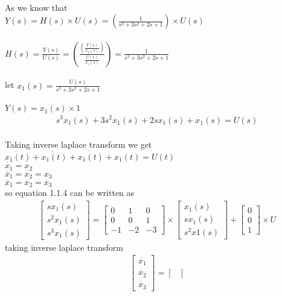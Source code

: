 \begin{enumerate}[label=\thesection.\arabic*.,ref=\thesection.\theenumi]
\\ As we know that
\\ $Y(s)=H(s) \times U(s)= (\frac{1}{s^3+3s^2+2s+1}) \times U(s) $
\\
\\ $H(s)=\frac{Y(s)}{U(s)}=(\frac{(\frac{Y(s)}{x_{1}(s)})}{\frac{U(s)}{x_{1}(s)}})=\frac{1}{s^3+3s^2+2s+1} $
\\
\\let   $x_{1}(s)=\frac{U(s)}{s^3+3s^2+2s+1}$
\\
\\$Y(s)=x_{1}(s)\times 1 $
\begin{align}
s^3x_{1}(s)+3s^2x_{1}(s)+2sx_{1}(s)+x_{1}(s)=U(s)
\end{align}
\\ Taking inverse laplace transform we get
\\$\dddot{x_{1}(t)}+\ddot{x_{1}(t)}+\dot{x_{1}(t)}+x_{1}(t)=U(t)$
\\$\dot{x_{1}}=x_{2}$
\\$\ddot{x_{1}}=\dot{x_{2}}=x_{3}$
\\$\dddot{x_{1}}=\ddot{x_{2}}=\dot{x_{3}}$
\\ so equation 1.1.4 can be written as
\\
\begin{gather}
\begin{bmatrix}
sx_{1}(s)\\
s^2x_{1}(s)\\
s^3x_{1}(s)
\end{bmatrix}
=
\begin{bmatrix}
0&1&0\\
0&0&1\\
-1&-2&-3
\end{bmatrix}\times \begin{bmatrix}
x_{1}(s)\\
sx_{1}(s)\\
s^2x{1}(s)
\end{bmatrix}
+
\begin{bmatrix}
0\\
0\\
1
\end{bmatrix} \times U
\end{gather}
taking inverse laplace transform
\begin{gather}
\begin{bmatrix}
\dot{x_{1}}\\
\dot{x_{2}}\\
\dot{x_{3}}
\end{bmatrix}
=
\begin{bmatrix}

\end{bmatrix}
\end{gather}
\end{enumerate}
